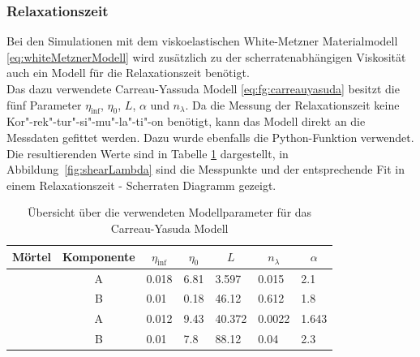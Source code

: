 \subsubsection{Relaxationszeit}
Bei den Simulationen mit dem viskoelastischen White-Metzner Materialmodell \eqref{eq:whiteMetznerModell} wird zusätzlich zu der scherratenabhängigen Viskosität auch ein Modell für die Relaxationszeit benötigt.\\
Das dazu verwendete Carreau-Yassuda Modell \eqref{eq:fg:carreauyasuda} besitzt die fünf Parameter $\eta_{\inf}$, $\eta_0$, $L$, $\alpha$ und $n_{\lambda}$. Da die Messung der Relaxationszeit keine Kor"-rek"-tur"-si"-mu"-la"-ti"-on benötigt, kann das Modell direkt an die Messdaten gefittet werden.
Dazu wurde ebenfalls die Python-Funktion  verwendet. Die resultierenden Werte sind in Tabelle \ref{fig:relaxParameter} dargestellt, in Abbildung~\ref{fig:shearLambda} sind die Messpunkte und der entsprechende Fit in einem Relaxationszeit - Scherraten Diagramm gezeigt.
\begin{table}
    \centering
    \begin{tabular}{l c l l l l l}
        \textbf{Mörtel} & 
        \textbf{Komponente} & 
        \multicolumn{1}{c}{$\eta_{\inf}$} & 
        \multicolumn{1}{c}{$\eta_0$} &
        \multicolumn{1}{c}{$L$} & 
        \multicolumn{1}{c}{$n_{\lambda}$} & 
        \multicolumn{1}{c}{$\alpha$} \\
        \hline
        \hline
        \multirow{2}{*}{\hit{}} & A & 0.018   & 6.81  & 3.597 & 0.015 & 2.1       \\ 
                                & B & 0.01  & 0.18  & 46.12 & 0.612 & 1.8     \\ 
        \hline
        \multirow{2}{*}{\re{}}  & A & 0.012 & 9.43 & 40.372  & 0.0022 & 1.643    \\ 
                                & B & 0.01   & 7.8  & 88.12  & 0.04 & 2.3         
    \end{tabular}
    \caption{Übersicht über die verwendeten Modellparameter für das Carreau-Yasuda Modell}
    \label{fig:relaxParameter}
\end{table}
%
